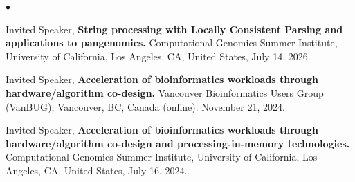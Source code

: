 \documentclass[margin,line]{res}
\newenvironment{list2}{
  \begin{list}{$\bullet$}{%
      \setlength{\itemsep}{0.1cm}
      \setlength{\parsep}{0in} \setlength{\parskip}{0in}
      \setlength{\topsep}{0in} \setlength{\partopsep}{0in} 
      \setlength{\leftmargin}{0.2in}}}{\end{list}}
\newcommand{\junk}[1]{}
\begin{document}
\begin{resume}
\begin{list2}
\item
  Invited Speaker, 
      {\bf  String processing with Locally Consistent Parsing and applications to pangenomics.}
  Computational Genomics Summer Institute, University of California, Los Angeles, CA, United States,
  July 14, 2026.

\junk{
\item
  Invited Speaker, 
      {\bf  Acceleration of bioinformatics workloads.}
  Computational Genomics Summer Institute, University of California, Los Angeles, CA, United States,
  July 13, 2026.

\item
  Invited Speaker, 
      {\bf  Acceleration of read mapping through hardware/algorithm co-design.}
  Computational Genomics Summer Institute, University of California, Los Angeles, CA, United States,
  July 14, 2025.
}


\item
  Invited Speaker, 
      {\bf  Acceleration of bioinformatics workloads through hardware/algorithm co-design.}
  Vancouver Bioinformatics Users Group (VanBUG), Vancouver, BC, Canada (online).
  November 21, 2024.


\junk{
\item
  Invited Speaker, 
      {\bf  Acceleration of read mapping through hardware/algorithm co-design.}
  Genome Informatics 2024, Hinxton, England.
  November 13, 2024.
}

\junk{
\item 
Invited Speaker,
\textbf{Locally consistent parsing in genomic
applications: from sketching to phylogenetic analysis.}
SAFARI Group, ETH Zurich, Zurich, Switzerland. November 11, 2024.
}

\junk{
\item 
Invited Speaker, 
{\bf Algorithms to characterize genomic structural variation using high throughput sequencing technologies.} Galen Medicine Days-2024: Precision Medicine in Health and Disease International Symposium, İzmir, Turkey, October 3, 2024.
}

\item
  Invited Speaker, 
      {\bf  Acceleration of bioinformatics workloads through hardware/algorithm co-design and processing-in-memory technologies.}
  Computational Genomics Summer Institute, University of California, Los Angeles, CA, United States,
  July 16, 2024.

\junk{
\item
  Lecture, 
      {\bf  Characterization of genomic structural variation using various sequencing technologies.}
  Computational Genomics Summer Institute, University of California, Los Angeles, CA, United States,
  July 26, 2023.
}


\end{list2}
\end{resume}
\end{document}
